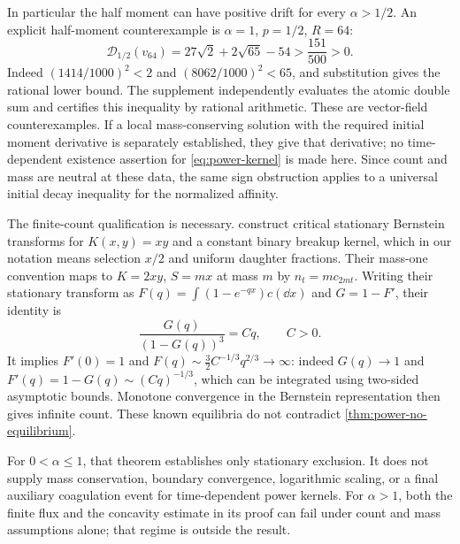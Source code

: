 In particular the half moment can have positive drift for every
$\alpha>1/2$. An explicit half-moment counterexample is $\alpha=1$, $p=1/2$, $R=64$:
\begin{equation}
 \mathcal D_{1/2}(v_{64})=27\sqrt2+2\sqrt{65}-54
 >\frac{151}{500}>0.
 \label{eq:power-half-positive}
\end{equation}
Indeed $(1414/1000)^2<2$ and $(8062/1000)^2<65$, and substitution gives
the rational lower bound. The supplement independently evaluates the
atomic double sum and certifies this inequality by rational arithmetic.
These are vector-field counterexamples. If a local mass-conserving solution
with the required initial moment derivative is separately established,
they give that derivative; no time-dependent existence assertion for
\eqref{eq:power-kernel} is made here. Since count and mass are neutral at
these data, the same sign obstruction applies to a universal initial decay
inequality for the normalized affinity.

The finite-count qualification is necessary. \citet[Proposition 4.3 and
Remark 4.4 of arXiv version 3, whose numbering we follow]{TranVan2022}
construct critical stationary
Bernstein transforms for $K(x,y)=xy$ and a constant binary breakup kernel,
which in our notation means selection $x/2$ and uniform daughter fractions.
Their mass-one convention maps to $K=2xy$, $S=mx$ at mass $m$ by
$n_t=m c_{2mt}$. Writing their stationary transform as
$F(q)=\int(1-e^{-qx})c(\dd x)$ and $G=1-F'$, their identity is
\[
 \frac{G(q)}{(1-G(q))^3}=Cq,\qquad C>0.
\]
It implies $F'(0)=1$ and
$F(q)\sim\tfrac32C^{-1/3}q^{2/3}\to\infty$: indeed $G(q)\to1$ and
$F'(q)=1-G(q)\sim(Cq)^{-1/3}$, which can be integrated using two-sided
asymptotic bounds. Monotone convergence in the Bernstein representation
then gives infinite count. These known equilibria do not contradict
\cref{thm:power-no-equilibrium}.

For $0<\alpha\leq1$, that theorem establishes only stationary exclusion.
It does not supply mass conservation, boundary convergence, logarithmic
scaling, or a final auxiliary coagulation event for time-dependent power
kernels. For $\alpha>1$, both the finite flux and the concavity estimate in
its proof can fail under count and mass assumptions alone; that regime is
outside the result.
